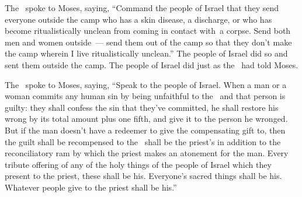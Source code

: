 
\begin{inparaenum}
   The \lord\ spoke to Moses, saying,%
   ``Command the people of Israel that they send everyone outside the camp who has a skin disease, a discharge, or who has become ritualistically unclean from coming in contact with\understood{}\ a corpse.%
   Send both men and women outside~--- send them out of the camp so that they don't make the camp wherein I live ritualistically unclean.''%
   The people of Israel did so and sent them outside the camp. The people of Israel did just as the \lord\ had told Moses.%

   The \lord\ spoke to Moses, saying,%
   ``Speak to the people of Israel. When a man or a woman commits any human sin by being unfaithful to the \lord\ and that person is guilty:%
   they shall confess the sin that they've committed, he shall restore his wrong by its total amount plus one fifth, and give it to the person he wronged.%
   But if the man doesn't have a redeemer to give the compensating gift to, then the guilt shall be recompensed to the \lord\ shall be the priest's in addition to the reconciliatory ram by which the priest makes an atonement for the man.%
   Every tribute offering of any of the holy things of the people of Israel which they present to the priest, these shall be his.%
   Everyone's sacred things shall be his. Whatever people give to the priest shall be his.''%


\end{inparaenum}
